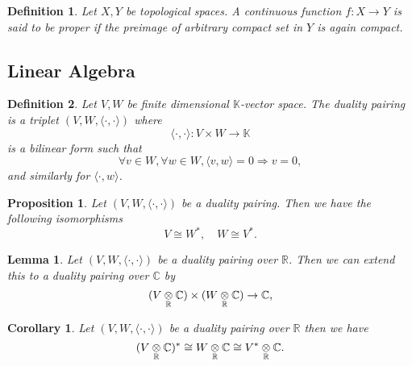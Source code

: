 \documentclass{article}
\newtheorem{proposition}{Proposition}[section]
\newtheorem{definition}{Definition}[section]
\newtheorem{lemma}{Lemma}[section]
\newtheorem{corollary}{Corollary}[section]
\numberwithin{equation}{section}
\newcommand{\tens}[1]{%
  \mathbin{\mathop{\otimes}\displaylimits_{#1}}%
}
\begin{document}
\begin{definition}
Let $X,Y$ be topological spaces. A continuous function $f:X\to Y$ is said to be proper if the preimage of arbitrary compact set in $Y$ is again compact.
\end{definition}

\subsection{Linear Algebra}

\begin{definition}
Let $V,W$ be finite dimensional $\mathbb{K}$-vector space. The duality pairing is a triplet $(V,W,\langle\cdot,\cdot\rangle)$ where 
\begin{equation*}
\langle\cdot,\cdot\rangle:V\times W\to\mathbb{K}
\end{equation*}
is a bilinear form such that
\begin{equation*}
\forall v\in W, \forall w\in W, \langle v,w\rangle = 0\Rightarrow v = 0,
\end{equation*}
and similarly for $\langle\cdot,w\rangle$.
\end{definition}

\begin{proposition}
Let $(V,W,\langle\cdot,\cdot\rangle)$ be a duality pairing. Then we have the following isomorphisms
\begin{equation*}
V\cong W^*,\quad W\cong V^*.
\end{equation*}
\end{proposition}

\begin{lemma}
Let $(V,W,\langle\cdot,\cdot\rangle)$ be a duality pairing over $\mathbb{R}$. Then we can extend this to a duality pairing over $\mathbb{C}$ by
\begin{equation*}
(V\tens{\mathbb{R}}\mathbb{C})\times (W\tens{\mathbb{R}}\mathbb{C})\to\mathbb{C},
\end{equation*}
\end{lemma}

\begin{corollary}
Let $(V,W,\langle\cdot,\cdot\rangle)$ be a duality pairing over $\mathbb{R}$ then we have
\begin{equation*}
(V\tens{\mathbb{R}}\mathbb{C})^*\cong W\tens{\mathbb{R}}\mathbb{C}\cong V^*\tens{\mathbb{R}}\mathbb{C}.
\end{equation*}
\end{corollary}
\end{document}
